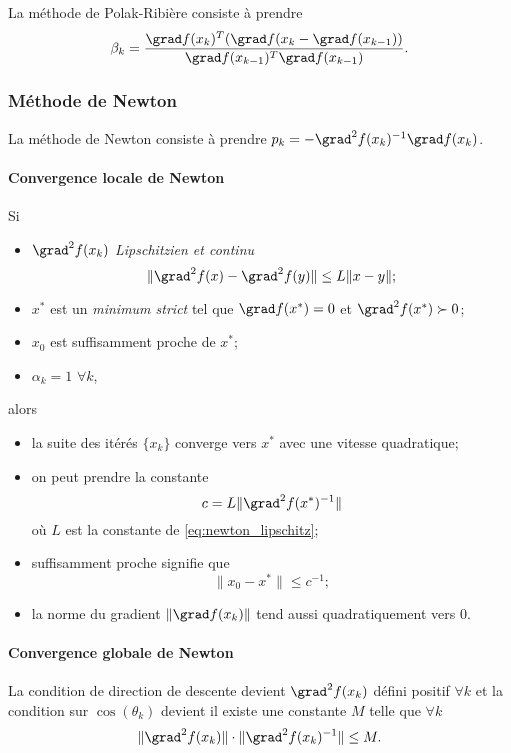 La méthode de Polak-Ribière consiste à prendre
\[ \beta_k = \frac{\grad f(x_{k})^T(\grad f(x_{k} - \grad f(x_{k-1}))}
{\grad f(x_{k-1})^T\grad f(x_{k-1})}. \]

\subsubsection{Méthode de Newton}
La méthode de Newton consiste à prendre
$p_k = -\grad^2 f(x_k)^{-1}\grad f(x_k)$.

\paragraph{Convergence locale de Newton}
Si
\begin{itemize}
  \item $\grad^2 f(x_k)$ \emph{Lipschitzien et continu}
    \begin{equation}
      \label{eq:newton_lipschitz}
      \|\grad^2f(x) - \grad^2f(y)\| \leq L\|x-y\|;
    \end{equation}
  \item $x^*$ est un \emph{minimum strict} tel que $\grad f(x^*) = 0$
    et $\grad^2 f(x^*) \succ 0$;
  \item $x_0$ est suffisamment proche de $x^*$;
  \item $\alpha_k = 1$ $\forall k$,
\end{itemize}
alors
\begin{itemize}
  \item la suite des itérés $\{x_k\}$ converge vers $x^*$ avec
    une vitesse quadratique;
  \item on peut prendre la constante
    \[ c = L\|\grad^2 f(x^*)^{-1}\| \]
    où $L$ est la constante de \eqref{eq:newton_lipschitz};
  \item suffisamment proche signifie que
    \[ \|x_0-x^*\| \leq c^{-1}; \]
  \item la norme du gradient $\|\grad f(x_k)\|$ tend aussi quadratiquement
    vers 0.
\end{itemize}

\paragraph{Convergence globale de Newton}
La condition de direction de descente devient $\grad^2 f(x_k)$ défini positif
$\forall k$
et la condition sur $\cos(\theta_k)$ devient il existe une constante $M$
telle que $\forall k$
\[ \|\grad^2 f(x_k)\|\cdot\|\grad^2 f(x_k)^{-1}\| \leq M. \]

